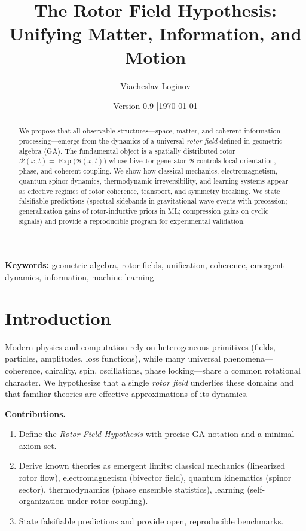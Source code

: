 \documentclass[11pt,a4paper]{article}
\title{\textbf{The Rotor Field Hypothesis: Unifying Matter, Information, and Motion}}
\author[1]{Viacheslav Loginov}
\affil[1]{Kyiv, Ukraine\\ \texttt{barthez.slavik@gmail.com}}
\date{\small Version 0.9 \quad|\quad \today}
\newcommand{\Exp}{\operatorname{Exp}}
\newcommand{\Rotor}{\mathcal{R}}
\newcommand{\Biv}{\mathcal{B}}
\theoremstyle{definition}
\theoremstyle{plain}
\theoremstyle{remark}
\begin{document}
\maketitle

\begin{abstract}
\noindent
We propose that all observable structures---space, matter, and coherent information processing---emerge from the dynamics of a universal \emph{rotor field} defined in geometric algebra (GA). The fundamental object is a spatially distributed rotor $\Rotor(x,t)=\Exp\!\big(\Biv(x,t)\big)$ whose bivector generator $\Biv$ controls local orientation, phase, and coherent coupling. We show how classical mechanics, electromagnetism, quantum spinor dynamics, thermodynamic irreversibility, and learning systems appear as effective regimes of rotor coherence, transport, and symmetry breaking. We state falsifiable predictions (spectral sidebands in gravitational-wave events with precession; generalization gains of rotor-inductive priors in ML; compression gains on cyclic signals) and provide a reproducible program for experimental validation. 
\end{abstract}

\noindent\textbf{Keywords:} geometric algebra, rotor fields, unification, coherence, emergent dynamics, information, machine learning

\vspace{1em}

\section{Introduction}
Modern physics and computation rely on heterogeneous primitives (fields, particles, amplitudes, loss functions), while many universal phenomena---coherence, chirality, spin, oscillations, phase locking---share a common rotational character. We hypothesize that a single \emph{rotor field} underlies these domains and that familiar theories are effective approximations of its dynamics.
\medskip

\noindent\textbf{Contributions.}
\begin{enumerate}[leftmargin=*,itemsep=2pt]
  \item Define the \emph{Rotor Field Hypothesis} with precise GA notation and a minimal axiom set.
  \item Derive known theories as emergent limits: classical mechanics (linearized rotor flow), electromagnetism (bivector field), quantum kinematics (spinor sector), thermodynamics (phase ensemble statistics), learning (self-organization under rotor coupling).
  \item State falsifiable predictions and provide open, reproducible benchmarks.
\end{enumerate}
\end{document}
